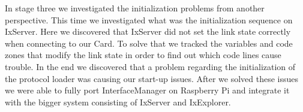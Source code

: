 In stage three we investigated the initialization problems from another
perspective. This time we investigated what was the initialization sequence on
IxServer. Here we discovered that IxServer did not set the link state correctly
when connecting to our Card. To solve that we tracked the variables and code
zones that modify the link state in order to find out which code lines cause
trouble. In the end we discovered that a problem regarding the initialization
of the protocol loader was causing our start-up issues. After we solved
these issues we were able to fully port InterfaceManager on Raspberry Pi and
integrate it with the bigger system consisting of IxServer and IxExplorer.
